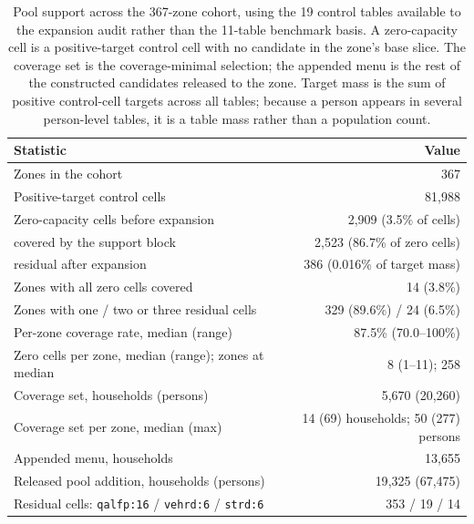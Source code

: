 \documentclass[review]{elsarticle}
\begin{document}
\begin{table}[h!]
\centering
\caption{Pool support across the 367-zone cohort, using the 19 control tables
available to the expansion audit rather than the 11-table benchmark basis. A
zero-capacity cell is a positive-target control cell with no candidate in the
zone's base slice. The coverage set is the coverage-minimal selection; the
appended menu is the rest of the constructed candidates released to the zone.
Target mass is the sum of positive control-cell targets across all tables;
because a person appears in several person-level tables, it is a table mass
rather than a population count.}
\label{tab:pool_support_stats}
\footnotesize
\setlength{\tabcolsep}{4pt}
\begin{tabular}{@{}lr@{}}
\toprule
\textbf{Statistic} & \textbf{Value} \\
\midrule
Zones in the cohort & 367 \\
Positive-target control cells & 81{,}988 \\
Zero-capacity cells before expansion & 2{,}909 (3.5\% of cells) \\
\quad covered by the support block & 2{,}523 (86.7\% of zero cells) \\
\quad residual after expansion & 386 (0.016\% of target mass) \\
Zones with all zero cells covered & 14 (3.8\%) \\
Zones with one / two or three residual cells & 329 (89.6\%) / 24 (6.5\%) \\
Per-zone coverage rate, median (range) & 87.5\% (70.0--100\%) \\
Zero cells per zone, median (range); zones at median & 8 (1--11); 258 \\
Coverage set, households (persons) & 5{,}670 (20{,}260) \\
Coverage set per zone, median (max) & 14 (69) households; 50 (277) persons \\
Appended menu, households & 13{,}655 \\
Released pool addition, households (persons) & 19{,}325 (67{,}475) \\
Residual cells: \texttt{qalfp:16} / \texttt{vehrd:6} / \texttt{strd:6} & 353 / 19 / 14 \\
\bottomrule
\end{tabular}
\end{table}




\end{document}
